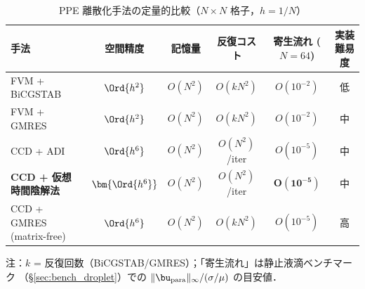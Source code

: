 \begin{table}[ht]
\centering
\caption{PPE 離散化手法の定量的比較（$N \times N$ 格子，$h = 1/N$）}
\label{tab:ccd_vs_fvm}
\renewcommand{\arraystretch}{1.4}
\begin{tabular}{lccccc}
\hline
手法 & 空間精度 & 記憶量 & 反復コスト & 寄生流れ ($N=64$) & 実装難易度 \\
\hline
FVM + BiCGSTAB & $\Ord{h^2}$ & $O(N^2)$ & $O(kN^2)$ & $O(10^{-2})$ & 低 \\
FVM + GMRES & $\Ord{h^2}$ & $O(N^2)$ & $O(kN^2)$ & $O(10^{-2})$ & 中 \\
CCD + ADI & $\Ord{h^6}$ & $O(N^2)$ & $O(N^2)$/iter & $O(10^{-5})$ & 中 \\
\textbf{CCD + 仮想時間陰解法} & $\bm{\Ord{h^6}}$ & $O(N^2)$ & $O(N^2)$/iter & $\bm{O(10^{-5})}$ & 中 \\
CCD + GMRES (matrix-free) & $\Ord{h^6}$ & $O(N^2)$ & $O(kN^2)$ & $O(10^{-5})$ & 高 \\
\hline
\end{tabular}

\smallskip
注：$k$ = 反復回数（BiCGSTAB/GMRES）；「寄生流れ」は静止液滴ベンチマーク
（§\ref{sec:bench_droplet}）での $\|\bu_{\mathrm{para}}\|_\infty/(\sigma/\mu)$ の目安値．
\end{table}


